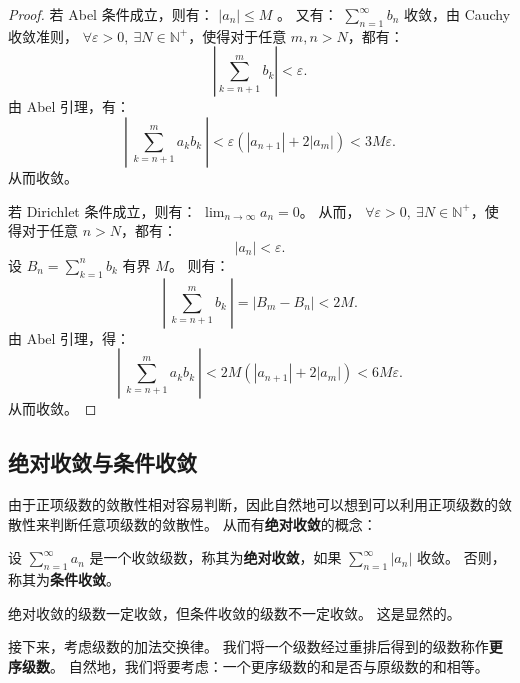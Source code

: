 \begin{proof}
  若 Abel 条件成立，则有： $|a_n| \leq M$ 。
  又有： $\sum_{n=1}^{\infty} b_n$ 收敛，由 Cauchy 收敛准则， $\forall \varepsilon > 0,\ \exists N \in \mathbb{N}^+$，使得对于任意 $m, n > N$，都有：
  \begin{equation*}
    \left| \sum_{k=n+1}^{m} b_k \right| < \varepsilon.
  \end{equation*}
  由 Abel 引理，有：
  \begin{equation*}
    \left|\ \sum_{k=n+1}^{m} a_k b_k \ \right|
    < \varepsilon \left( |a_{n+1}| + 2 |a_m| \right)
    < 3M \varepsilon.
  \end{equation*}
  从而收敛。

  若 Dirichlet 条件成立，则有： $\lim_{n \to \infty} a_n = 0$。
  从而， $\forall \varepsilon > 0,\ \exists N \in \mathbb{N}^+$，使得对于任意 $n > N$，都有：
  \begin{equation*}
    |a_n| < \varepsilon.
  \end{equation*}
  设 $B_n = \sum_{k=1}^{n} b_k$ 有界 $M$。
  则有：
  \begin{equation*}
    \left|\ \sum_{k=n+1}^{m} b_k \ \right|
    = \left| B_m - B_n \right|
    < 2M.
  \end{equation*}
  由 Abel 引理，得：
  \begin{equation*}
    \left|\ \sum_{k=n+1}^{m} a_k b_k \ \right|
    < 2M \left( |a_{n+1}| + 2 |a_m| \right)
    < 6M \varepsilon.
  \end{equation*}
  从而收敛。

\end{proof}

\subsection{绝对收敛与条件收敛}\label{subsec:absolute-convergence}

由于正项级数的敛散性相对容易判断，因此自然地可以想到可以利用正项级数的敛散性来判断任意项级数的敛散性。
从而有\textbf{绝对收敛}的概念：

\begin{definition}[绝对收敛]\label{def:absolute-convergence}
  设 $\sum_{n=1}^{\infty} a_n$ 是一个收敛级数，称其为\textbf{绝对收敛}，如果 $\sum_{n=1}^{\infty} |a_n|$ 收敛。
  否则，称其为\textbf{条件收敛}。
\end{definition}

绝对收敛的级数一定收敛，但条件收敛的级数不一定收敛。
这是显然的。

接下来，考虑级数的加法交换律。
我们将一个级数经过重排后得到的级数称作\textbf{更序级数}。
自然地，我们将要考虑：一个更序级数的和是否与原级数的和相等。

